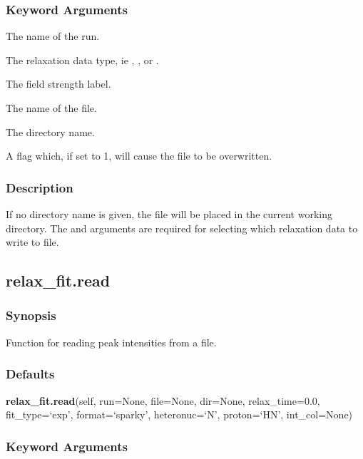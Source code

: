 \subsubsection{Keyword Arguments}


  The name of the run.

  The relaxation data type, ie 
, 
, or 
.

  The field strength label.

  The name of the file.

  The directory name.

  A flag which, if set to 1, will cause the file to be overwritten.

\subsubsection{Description}

If no directory name is given, the file will be placed in the current working directory.
The 
 and 
 arguments are required for selecting which relaxation data
to write to file.


\newpage

\subsection{relax\_fit.read}


\subsubsection{Synopsis}

Function for reading peak intensities from a file.

\subsubsection{Defaults}

\textsf{\textbf{relax\_fit.read}(self, run=None, file=None, dir=None, relax\_time=0.0, fit\_type=`exp', format=`sparky', heteronuc=`N', proton=`HN', int\_col=None)}


\subsubsection{Keyword Arguments}



